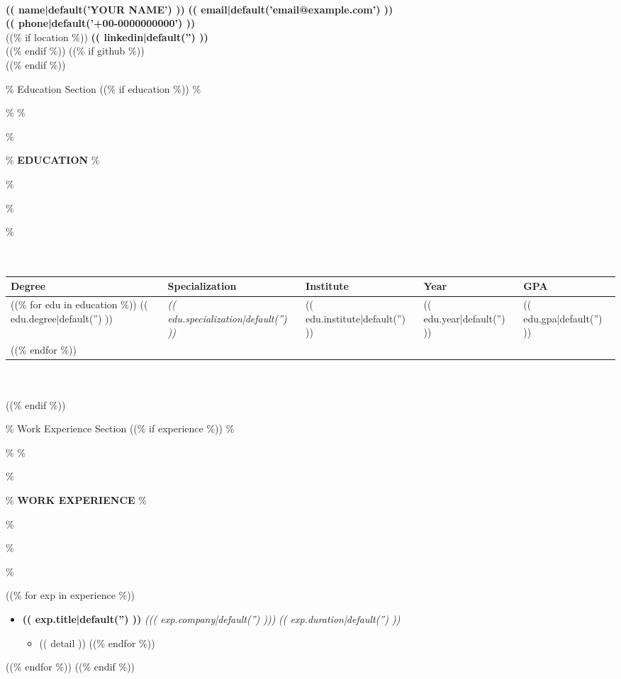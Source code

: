 \documentclass[a4paper,10pt]{article}
\newcommand{\lsep}{-0.5cm}
\newcommand{\resheading}[1]{\%
\par\noindent\%
\small\%
\colorbox{mygrey}{\%
\parbox{\dimexpr\linewidth-2\fboxsep\relax}{\%
\textbf{#1}\%
}\%
}\%
\par\nobreak\%
}
\begin{document}
\hspace{0.5cm}\\[-1.8cm]
\textbf{ (( name|default('YOUR NAME') )) } \hspace{9.6cm} {\bf (( email|default('email@example.com') ))}\\
 \hspace{10.3 cm} {\bf (( phone|default('+00-0000000000') ))} \\
((\% if location \%))
 \hspace{7.9 cm} {\bf (( linkedin|default('') ))} \\
((\% endif \%))
((\% if github \%))
 \\
((\% endif \%))

\% Education Section
((\% if education \%))
\vspace{-2mm}
\resheading{\textbf{EDUCATION} }\\[\lsep]\\ \\
\indent \begin{tabular}{ p{2.5cm} @{\hskip 0.15in} p{5.5cm} @{\hskip 0.15in} p{3.5cm} @{\hskip 0.15in} p{2.5cm} @{\hskip 0.15in} p{1.5cm} }
\toprule
\textbf{Degree} & \textbf{Specialization} & \textbf{Institute} & \textbf{Year} & \textbf{GPA} \\
\midrule
((\% for edu in education \%))
(( edu.degree|default('') )) & \textit{ (( edu.specialization|default('') )) } & (( edu.institute|default('') )) & (( edu.year|default('') )) & (( edu.gpa|default('') )) \\
((\% endfor \%))
\bottomrule
\end{tabular}
\\ \\
((\% endif \%))

\% Work Experience Section
((\% if experience \%))
\vspace{1mm}
\resheading{\textbf{WORK EXPERIENCE} }
((\% for exp in experience \%))
\begin{itemize}
\vspace{-1mm}
\item {\bf (( exp.title|default('') )) } \textit{((( exp.company|default('') )))}
\textit{\hfill {(( exp.duration|default('') ))}}

\vspace{-1mm}
\begin{itemize}
((\% for detail in exp.details \%))
\item (( detail ))
((\% endfor \%))
\vspace{-1mm}
\end{itemize}
\end{itemize}
((\% endfor \%))
((\% endif \%))
\end{document}
